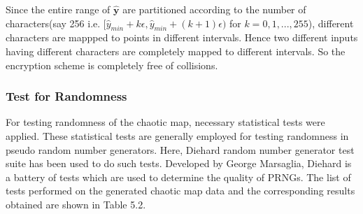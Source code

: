 Since the entire range of $\hat{\textbf{y}}$ are partitioned according to the number of characters(say 256 i.e. $[\hat{y}_{min}+k\epsilon,\hat{y}_{min}+(k+1)\epsilon )$ for $k=0,1, ... , 255$), different characters are mappped to points in different intervals. Hence two different inputs having different characters are completely mapped to different intervals. So the encryption scheme is completely free of collisions. 

\subsubsection{Test for Randomness}
For testing randomness of the chaotic map, necessary statistical tests were applied. These statistical tests are generally employed for testing randomness in pseudo random number generators. Here, Diehard random number generator test suite has been used to do such tests. Developed by George Marsaglia, Diehard is a battery of tests which are used to determine the quality of PRNGs. The list of tests performed on the generated chaotic map data and the corresponding results obtained are shown in Table 5.2.

